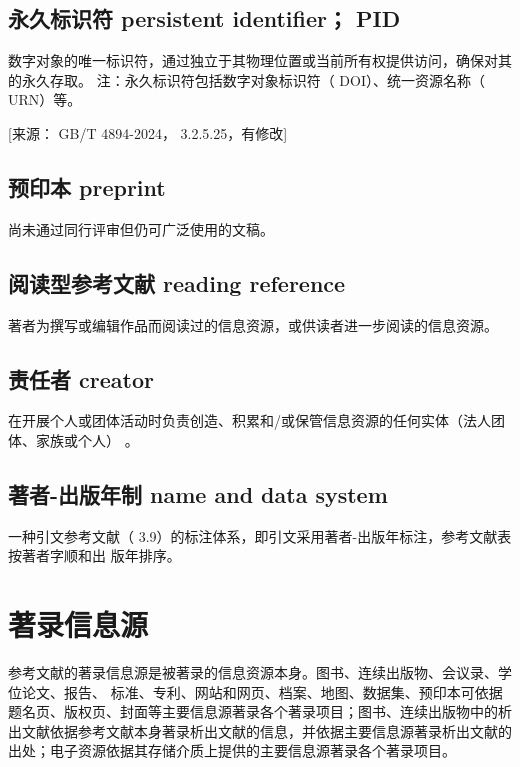 \documentclass{article}
\begin{document}
\subsection{永久标识符 persistent identifier； PID}
数字对象的唯一标识符，通过独立于其物理位置或当前所有权提供访问，确保对其的永久存取。
注：永久标识符包括数字对象标识符（ DOI）、统一资源名称（ URN）等。

[来源： GB/T 4894-2024， 3.2.5.25，有修改]

\subsection{预印本 preprint}
尚未通过同行评审但仍可广泛使用的文稿。


\subsection{阅读型参考文献 reading reference}
著者为撰写或编辑作品而阅读过的信息资源，或供读者进一步阅读的信息资源。

\subsection{责任者 creator}
在开展个人或团体活动时负责创造、积累和/或保管信息资源的任何实体（法人团体、家族或个人） 。


\subsection{著者-出版年制 name and data system}
一种引文参考文献（ 3.9）的标注体系，即引文采用著者-出版年标注，参考文献表按著者字顺和出
版年排序。


\section{著录信息源}

参考文献的著录信息源是被著录的信息资源本身。图书、连续出版物、会议录、学位论文、报告、
标准、专利、网站和网页、档案、地图、数据集、预印本可依据题名页、版权页、封面等主要信息源著录各个著录项目；图书、连续出版物中的析出文献依据参考文献本身著录析出文献的信息，并依据主要信息源著录析出文献的出处；电子资源依据其存储介质上提供的主要信息源著录各个著录项目。
\end{document}

